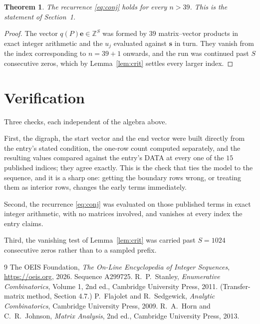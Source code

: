 \documentclass[11pt,a4paper]{article}
\theoremstyle{plain}
\newtheorem{theorem}{Theorem}
\theoremstyle{definition}
\begin{document}
\begin{theorem}
The recurrence \eqref{eq:conj} holds for every $n>39$. This is the statement of
Section~1.
\end{theorem}

\begin{proof}
The vector $q(P)\mathbf{e}\in\mathbb{Z}^{S}$ was formed by $39$ matrix--vector
products in exact integer arithmetic and the $u_j$ evaluated against $\mathbf{s}$ in turn.
They vanish from the index corresponding to $n=39+1$ onwards, and the run was continued
past $S$ consecutive zeros, which by Lemma~\ref{lem:crit} settles every larger index.
\end{proof}

\section{Verification}

Three checks, each independent of the algebra above.

First, the digraph, the start vector and the end vector were built directly from the
entry's stated condition, the one-row count computed separately, and the resulting values
compared against the entry's DATA at every one of the $15$ published indices; they
agree exactly. This is the check that ties the model to the sequence, and it is a sharp one:
getting the boundary rows wrong, or treating them as interior rows, changes the early terms
immediately.

Second, the recurrence \eqref{eq:conj} was evaluated on those published terms in exact
integer arithmetic, with no matrices involved, and vanishes at every index the entry claims.

Third, the vanishing test of Lemma~\ref{lem:crit} was carried past $S=1024$ consecutive
zeros rather than to a sampled prefix.

\begin{thebibliography}{9}
 The OEIS Foundation, \emph{The On-Line Encyclopedia of Integer
Sequences}, \url{https://oeis.org}, 2026. Sequence A299725.
 R.~P.~Stanley, \emph{Enumerative Combinatorics}, Volume 1, 2nd ed.,
Cambridge University Press, 2011. (Transfer-matrix method, Section 4.7.)
 P.~Flajolet and R.~Sedgewick, \emph{Analytic Combinatorics}, Cambridge
University Press, 2009.
 R.~A.~Horn and C.~R.~Johnson, \emph{Matrix Analysis}, 2nd ed., Cambridge
University Press, 2013.
\end{thebibliography}
\end{document}
